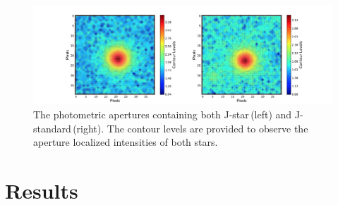 \documentclass[onecolumn]{aastex6}
\begin{document}
\begin{figure}[ht]
  \centering
  \includegraphics[scale=0.4]{star_v2.png}%
  \caption{The photometric apertures containing both J-star\,(left) and J-standard\,(right). The contour levels are provided to observe the aperture localized intensities of both stars.}
  \label{stars}
\end{figure}






\clearpage
\section{Results}
\end{document}
